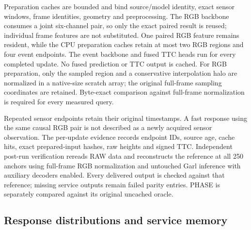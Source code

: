Preparation caches are bounded and bind source/model identity, exact sensor windows, frame identities, geometry and preprocessing. The RGB backbone consumes a joint six-channel pair, so only the exact paired result is reused; individual frame features are not substituted. One paired RGB feature remains resident, while the CPU preparation caches retain at most two RGB regions and four event endpoints. The event backbone and fused TTC heads run for every completed update. No fused prediction or TTC output is cached. For RGB preparation, only the sampled region and a conservative interpolation halo are normalized in a native-size scratch array; the original full-frame sampling coordinates are retained. Byte-exact comparison against full-frame normalization is required for every measured query.

Repeated sensor endpoints retain their original timestamps. A fast response using the same causal RGB pair is not described as a newly acquired sensor observation. The per-update evidence records endpoint IDs, source age, cache hits, exact prepared-input hashes, raw heights and signed TTC. Independent post-run verification rereads RAW data and reconstructs the reference at all 250 anchors using full-frame RGB normalization and untouched Garl inference with auxiliary decoders enabled. Every delivered output is checked against that reference; missing service outputs remain failed parity entries. PHASE is separately compared against its original uncached oracle.



\subsection{Response distributions and service memory}

\begin{table}[H]
\centering\footnotesize
\caption{\textbf{Each independent graph-service replay.} p50/p95/p99 (ms) use scheduled-arrival response among valid TTC outputs only. Coverage, queue drops and failed responses remain explicit; a conditional p95 from an incomplete run is not a complete-service latency.}

\end{table}

\begin{table}[H]
\centering\small
\caption{\textbf{Secondary clocks, in milliseconds.} Available p95 starts after RAW payload availability; service p95 starts at consumer execution. Both are conditional on valid outputs and exclude some work counted by the primary response clock.}

\end{table}

